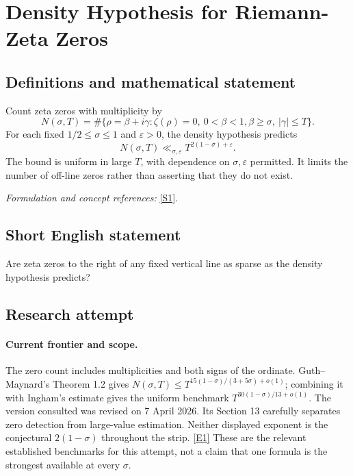 \documentclass[11pt,a4paper]{article}
\newcommand{\sref}[2]{\hyperlink{source:#1:#2}{[S#2]}}
\newcommand{\eref}[2]{\hyperlink{extra:#1:#2}{[E#2]}}
\newif\ifshowcatalogue
\newcommand{\cataloguescope}[1]{\ifshowcatalogue
 \paragraph{Exact scope in the supplied catalogue.}
 \begin{quote}\small #1\end{quote}\fi}
\numberwithin{equation}{section}
\begin{document}
\setcounter{section}{0}
\clearpage
\section*{\texorpdfstring{Density Hypothesis for Riemann-Zeta Zeros}{Density Hypothesis for Riemann-Zeta Zeros}}\label{statement}
\subsection{Definitions and mathematical statement}
Count zeta zeros with multiplicity by
\[
 N(\sigma,T)=\#\{\rho=\beta+i\gamma:\zeta(\rho)=0,\ 0<\beta<1,
                                  \beta\ge\sigma,\ |\gamma|\le T\}.
\]
For each fixed $1/2\le\sigma\le1$ and $\varepsilon>0$, the density hypothesis predicts
\[
 N(\sigma,T)\ll_{\sigma,\varepsilon}T^{2(1-\sigma)+\varepsilon}.
\]
The bound is uniform in large $T$, with dependence on $\sigma,\varepsilon$ permitted. It limits the number of off-line zeros rather than asserting that they do not exist.
\par\smallskip\textit{Formulation and concept references:} \sref{statement}{1}.
\cataloguescope{Prove that for every sigma with 1/2 <= sigma <= 1 and every epsilon > 0, the number N(sigma,T) of nontrivial zeros rho = beta + i gamma of the Riemann zeta function with beta >= sigma and |gamma| <= T satisfies N(sigma,T) <= C\_\{sigma,epsilon\} T\textasciicircum{}\{2(1-sigma)+epsilon\} for all sufficiently large T.}
\subsection{Short English statement}
Are zeta zeros to the right of any fixed vertical line as sparse as the density hypothesis predicts?
\subsection{Research attempt}

\paragraph{Current frontier and scope.}
The zero count includes multiplicities and both signs of the ordinate.
Guth--Maynard's Theorem 1.2 gives
$N(\sigma,T)\leq T^{15(1-\sigma)/(3+5\sigma)+o(1)}$; combining it with
Ingham's estimate gives the uniform benchmark
$T^{30(1-\sigma)/13+o(1)}$.  The version consulted was revised on
7 April 2026.  Its Section 13 carefully separates zero detection from
large-value estimation.  Neither displayed exponent is the conjectural
$2(1-\sigma)$ throughout the strip. \eref{statement}{1}
These are the relevant established benchmarks for this attempt, not a
claim that one formula is the strongest available at every $\sigma$.
\end{document}
